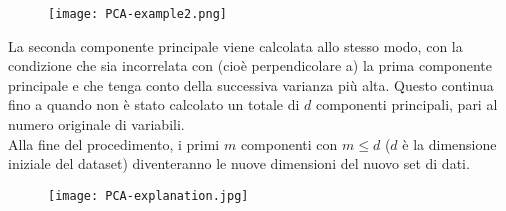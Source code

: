            \begin{figure}[h]
                \centering
                \texttt{[image: PCA-example2.png]}
            \end{figure}
            
            La seconda componente principale viene calcolata allo stesso modo, con la condizione che sia incorrelata con (cioè perpendicolare a) la prima componente principale e che tenga conto della successiva varianza più alta.
            Questo continua fino a quando non è stato calcolato un totale di $d$ componenti principali, pari al numero originale di variabili.
            \\[1\baselineskip]
            Alla fine del procedimento, i primi $m$ componenti con $m \le d$ ($d$ è la dimensione iniziale del dataset) diventeranno le nuove dimensioni del nuovo set di dati.

            \begin{figure}[h]
                \centering
                \texttt{[image: PCA-explanation.jpg]}
            \end{figure}

        \clearpage